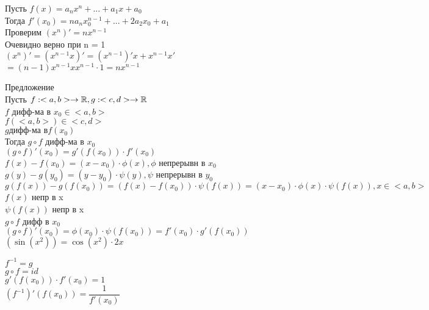 \begin{consequence}
	Пусть $ f(x) = a_n x^n + ... + a_1 x + a_0 $ \\
	Тогда $ f'(x_0) = na_n x_0^{n-1} + ... + 2 a_2 x_0 + a_1 $ \\
	Проверим $ (x^n)' = nx^{n-1} $ \\
	Очевидно верно при n = 1 \\
	$  (x^n)' = (x^{n-1} x )' = (x^{n-1})' x + x^{n-1} x' $ \\
	$ = (n-1) x^{n-1} x x^{n-1} \cdot 1 = nx^{n-1} $   
\end{consequence}

Предложение \\
Пусть $ f : <a,b> \rightarrow \mathbb{R}, g : <c, d> \rightarrow \mathbb{R} $ \\
$ f $ дифф-ма в $ x_0 \in <a,b> $ \\
$ f(<a,b>) \in <c,d> $ \\
$ g \text{дифф-ма в} f(x_0) $ \\
Тогда $ g \circ f $ дифф-ма в $ x_0 $ \\
$ (g \circ f)' (x_0) = g'(f(x_0)) \cdot f'(x_0) $ \\
$ f(x) - f(x_0) =(x-x_0) \cdot \phi(x), \phi $ непрерывн в $x_0$ \\
$ g(y) - g(y_0) = (y - y_0) \cdot \psi (y), \psi $ непрерывн в $ y_0 $ \\
$ g(f(x)) - g(f(x_0)) = ( f(x) - f(x_0) ) \cdot \psi(f(x)) = (x-x_0) \cdot \phi(x) \cdot \psi(f(x)), x \in <a,b> $ \\
$ f(x) $ непр в x \\
$ \psi(f(x)) $ непр в x \\
$ g \circ f $ дифф в $ x_0$ \\
$ (g \circ f)'(x_0) = \phi(x_0) \cdot \psi(f(x_0)) = f'(x_0) \cdot g'(f(x_0)) $ \\

$ (\sin(x^2)) = \cos(x^2) \cdot 2x $


$ f^{-1} = g $ \\
$ g \circ f = id $ \\
$ g'(f(x_0)) \cdot f'(x_0) = 1 $ \\
$ (f^{-1})' (f(x_0)) = \dfrac{1}{f'(x_0)} $\\

 






 